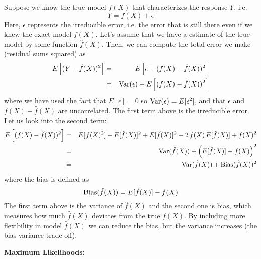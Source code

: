 \documentclass[aps,prl,preprint,superscriptaddress]{revtex4-1}
\begin{document}
Suppose we know the true model $f(X)$ that characterizes the response $Y$, i.e.
%
\begin{equation}
Y = f(X) + \epsilon
\end{equation}
%
Here, $\epsilon$ represents the irreducible error, i.e. the error that is still there even if we knew the exact model $f(X)$. 
Let's assume that we have a estimate of the true model by some function $\hat{f}(X)$. Then, we can compute the total 
error we make (residual sums squared) as
%
\begin{eqnarray}
E\left[ (Y - \hat{f}(X))^2 \right] &=& E \left[ \epsilon + (f(X) - \hat{f}(X))^2 \right] \nonumber\\
&=& {\rm Var}(\epsilon) + E\left[ (f(X) - \hat{f}(X))^2 \right] 
\end{eqnarray}
% 
where we have used the fact that $E[\epsilon]=0$ so ${\rm Var}(\epsilon) = E[\epsilon^2]$, and that $\epsilon$ and
$f(X) - \hat{f}(X)$ are uncorrelated. The first term above is the irreducible error. Let us look into the
second term:
%
\begin{eqnarray}
E\left[ (f(X) - \hat{f}(X))^2 \right] &=& E[ f(X)^2 ] - E[\hat{f}(X)]^2 + E[\hat{f}(X)]^2 - 2\, f(X)\, E[\hat{f}(X)] + f(X)^2 \nonumber\\
 &=& {\rm Var}(\hat{f}(X)) + \left( E[\hat{f}(X)] - f(X) \right)^2 \nonumber\\
 &=& {\rm Var}(\hat{f}(X)) + {\rm Bias}(\hat{f}(X))^2
\end{eqnarray}
%
where the bias is defined as
%
\begin{equation}
{\rm Bias}({\hat f}(X)) = E[{\hat f}(X)] - f(X)
\end{equation}
%
The first term above is the variance of $\hat{f}(X)$ and the second one is bias, which measures how much $\hat{f}(X)$ 
deviates from the true $f(X)$. By including more flexibility in model $\hat{f}(X)$ we can reduce the bias, but the
variance increases (the bias-variance trade-off).

\vspace{0.5cm}

{\bf Maximum Likelihoods:}
\end{document}
